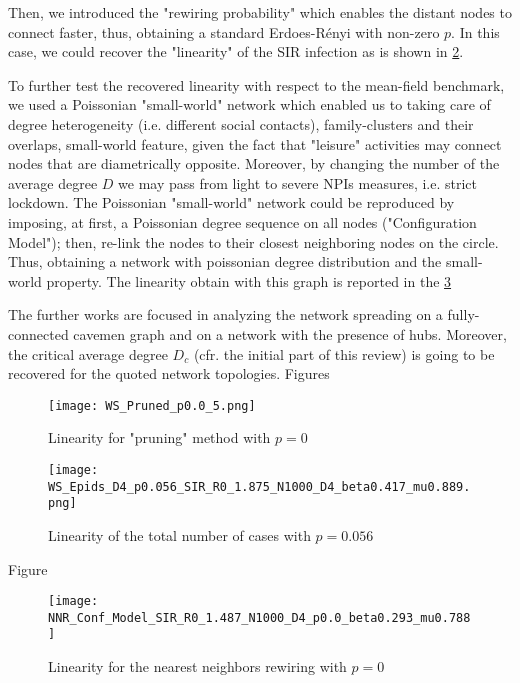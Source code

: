 \documentclass[a4paper,11pt,twoside]{report} %
\begin{document}
Then, we introduced the "rewiring probability" which enables the distant nodes to connect faster, thus, obtaining a standard Erdoes-Rényi with non-zero $p$. In this case, we could recover the "linearity" of the SIR infection as is shown in \ref{fig::pruning_p0.1}.

To further test the recovered linearity with respect to the mean-field benchmark, we used a Poissonian "small-world" network which enabled us to taking care of degree heterogeneity (i.e. different social contacts), family-clusters and their overlaps, small-world feature, given the fact that "leisure" activities may connect nodes that are diametrically opposite. Moreover, by changing the number of the average degree $D$ we may pass from light to severe NPIs measures, i.e. strict lockdown.
The Poissonian "small-world" network could be reproduced by imposing, at first, a Poissonian degree sequence on all nodes ("Configuration Model"); then, re-link the nodes to their closest neighboring nodes on the circle. Thus, obtaining a network with poissonian degree distribution and the small-world property.
The linearity obtain with this graph is reported in the \ref{fig::NNR_Conf_Model}

The further works are focused in analyzing the network spreading on a fully-connected cavemen graph and on a network with the presence of hubs.
Moreover, the critical average degree $D_c$ (cfr. the initial part of this review) is going to be recovered for the quoted network topologies.
\newpage
Figures
\begin{figure}[t]
	\vspace*{-.5cm}
	\centering
	\texttt{[image: WS\_Pruned\_p0.0\_5.png]}
	\caption{Linearity for "pruning" method with $p = 0$}
	\label{fig::pruning_p0}
\end{figure}
\begin{figure}[tbph]
	\centering
	\texttt{[image: WS\_Epids\_D4\_p0.056\_SIR\_R0\_1.875\_N1000\_D4\_beta0.417\_mu0.889.png]}
	\caption{Linearity of the total number of cases with $p = 0.056$}
	\label{fig::pruning_p0.1}
\end{figure}

\newpage
Figure
\begin{figure}
	\centering
	\texttt{[image: NNR\_Conf\_Model\_SIR\_R0\_1.487\_N1000\_D4\_p0.0\_beta0.293\_mu0.788]}
	\caption{Linearity for the nearest neighbors rewiring with $p = 0$}
	\label{fig::NNR_Conf_Model}
\end{figure}
\end{document}
